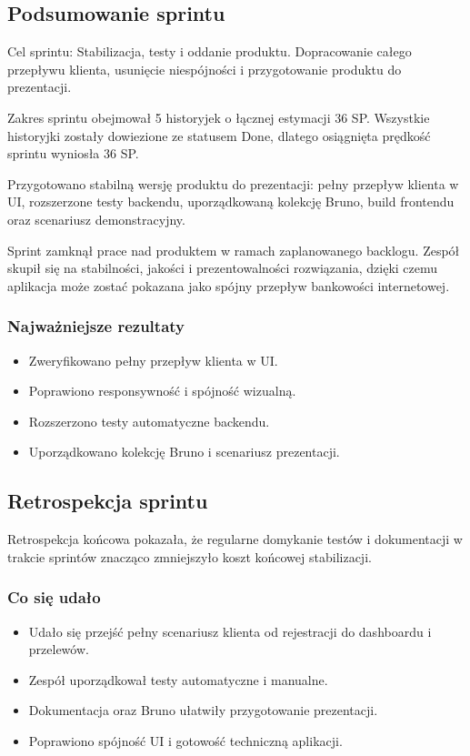 \documentclass[12pt,a4paper]{article}
\begin{document}
\subsection*{Podsumowanie sprintu}
Cel sprintu: Stabilizacja, testy i oddanie produktu. Dopracowanie całego przepływu klienta, usunięcie niespójności i przygotowanie produktu do prezentacji.

Zakres sprintu obejmował 5 historyjek o łącznej estymacji 36 SP. Wszystkie historyjki zostały dowiezione ze statusem Done, dlatego osiągnięta prędkość sprintu wyniosła 36 SP.

Przygotowano stabilną wersję produktu do prezentacji: pełny przepływ klienta w UI, rozszerzone testy backendu, uporządkowaną kolekcję Bruno, build frontendu oraz scenariusz demonstracyjny.

Sprint zamknął prace nad produktem w ramach zaplanowanego backlogu. Zespół skupił się na stabilności, jakości i prezentowalności rozwiązania, dzięki czemu aplikacja może zostać pokazana jako spójny przepływ bankowości internetowej.

\subsubsection*{Najważniejsze rezultaty}
\begin{itemize}
\item Zweryfikowano pełny przepływ klienta w UI.
\item Poprawiono responsywność i spójność wizualną.
\item Rozszerzono testy automatyczne backendu.
\item Uporządkowano kolekcję Bruno i scenariusz prezentacji.
\end{itemize}

\subsection*{Retrospekcja sprintu}
Retrospekcja końcowa pokazała, że regularne domykanie testów i dokumentacji w trakcie sprintów znacząco zmniejszyło koszt końcowej stabilizacji.

\subsubsection*{Co się udało}
\begin{itemize}
\item Udało się przejść pełny scenariusz klienta od rejestracji do dashboardu i przelewów.
\item Zespół uporządkował testy automatyczne i manualne.
\item Dokumentacja oraz Bruno ułatwiły przygotowanie prezentacji.
\item Poprawiono spójność UI i gotowość techniczną aplikacji.
\end{itemize}
\end{document}
